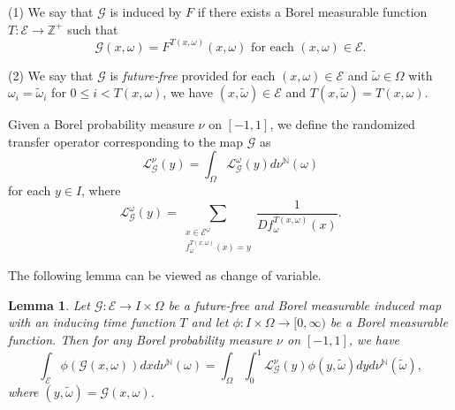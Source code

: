 \documentclass[11pt,oneside]{article}
\theoremstyle{plain}
\newtheorem{lem}{Lemma}[section]
\numberwithin{equation}{section}
\numberwithin{figure}{section}
\numberwithin{table}{section}
\begin{document}
(1) We say that $\mathscr G$ is induced by $F$ if there exists a Borel measurable function $T : \mathcal E \to \mathbb Z^+$ such that 
\[
\mathscr G(x, \omega) = F^{T(x, \omega)} (x, \omega) \mbox{ for each \ } (x, \omega) \in \mathcal E.
\]


(2) We say that $\mathscr G$ is {\it future-free} provided for each $(x, \omega) \in \mathcal E$ and $\tilde \omega \in \Omega$ with $\omega_i = \tilde \omega_i$ for $0 \leq i < T(x, \omega)$, we have $(x, \tilde \omega) \in \mathcal E$ and $T(x, \tilde \omega) = T(x, \omega)$.


Given a Borel probability measure $\nu$ on $[-1, 1]$, we define the randomized transfer operator corresponding to the map $\mathscr G$ as 
\begin{equation}
\mathcal L_{\mathscr G}^{\nu} (y) = \int_{\Omega} \mathcal L_{\mathscr G}^{\omega} (y) d \nu^{\mathbb N} (\omega)
\end{equation}
for each $y \in I$, where
\begin{equation}
 \mathcal L_{\mathscr G}^{\omega} (y) = \sum_{\substack{x \in \mathcal E^{\omega} \\ f_{\omega}^{T(x, \omega)}(x) =y}} \frac{1}{Df_{\omega}^{T(x, \omega)}(x)}.
\end{equation}


The following lemma can be viewed as change of variable.


\begin{lem}

Let $\mathscr G: \mathcal E \to I \times \Omega$ be a future-free and Borel measurable induced map with an inducing time function $T$ and let $\phi: I \times \Omega \to [0, \infty)$ be a Borel measurable function. Then for any Borel probability measure $\nu$ on $[-1, 1]$, we have
\[
\int_{\mathcal E} \phi(\mathscr G(x, \omega)) dx d \nu^{\mathbb N} (\omega) = \int_{\Omega} \int_0^1 \mathcal L_{\mathscr G}^{\nu} (y) \phi(y, \tilde \omega) dy d  \nu^{\mathbb N} (\tilde \omega),
\]
where $(y, \tilde \omega) = \mathscr G(x, \omega)$.

\end{lem}
\end{document}

